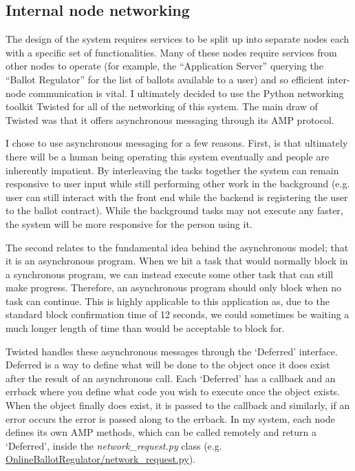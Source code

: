 \documentclass{article}
\begin{document}
\clearpage    
\subsection{Internal node networking}
\label{sec:InternalNodeNetworking}
The design of the system requires services to be split up into separate nodes each with a specific set of functionalities. Many of these nodes require services from other nodes to operate (for example, the ``Application Server'' querying the ``Ballot Regulator'' for the list of ballots available to a user) and so efficient inter-node communication is vital. I ultimately decided to use the Python networking toolkit Twisted \citep{63_twisted_2017} for all of the networking of this system. The main draw of Twisted was that it offers asynchronous messaging through its AMP protocol.


I chose to use asynchronous messaging for a few reasons. First, is that ultimately there will be a human being operating this system eventually and people are inherently impatient. By interleaving the tasks together the system can remain responsive to user input while still performing other work in the background (e.g. user can still interact with the front end while the backend is registering the user to the ballot contract). While the background tasks may not execute any faster, the system will be more responsive for the person using it.

The second relates to the fundamental idea behind the asynchronous model; that it is an asynchronous program. When we hit a task that would normally block in a synchronous program, we can instead execute some other task that can still make progress. Therefore, an asynchronous program should only block when no task can continue. This is highly applicable to this application as, due to the standard block confirmation time of 12 seconds, we could sometimes be waiting a much longer length of time than would be acceptable to block for.

Twisted handles these asynchronous messages through the `Deferred' interface. Deferred is a way to define what will be done to the object once it does exist after the result of an asynchronous call. Each `Deferred' has a callback and an errback where you define what code you wish to execute once the object exists. When the object finally does exist, it 
is passed to the callback and similarly, if an error occurs the error is passed along to the errback. In my system, each node defines its own AMP methods, which can be called remotely and return a `Deferred', inside the \textit{network\_request.py} class (e.g. \href{https://github.com/Mattie432/Blockchain-Voting-System/blob/master/Programming/4_OnlineBallotRegulator/onlineballotregulator/network_request.py}{OnlineBallotRegulator/network\_request.py}).
\end{document}
